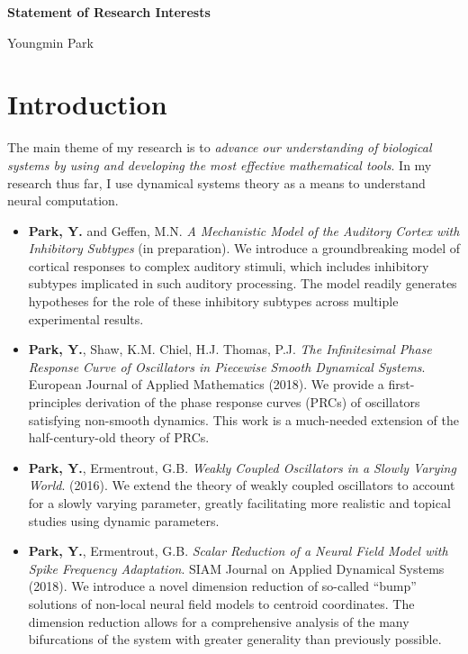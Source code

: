 \documentclass[a4paper,11pt]{article}
\begin{document}
\begin{center}
\Large \textbf{Statement of Research Interests}

\Large Youngmin Park
\end{center}


\section{Introduction}
The main theme of my research is to \textit{advance our understanding of biological systems by using and developing the most effective mathematical tools}. In my research thus far, I use dynamical systems theory as a means to understand neural computation.

\begin{itemize}
 \item \textbf{Park, Y.} and Geffen, M.N. \textit{A Mechanistic Model of the Auditory Cortex with Inhibitory Subtypes} (in preparation). We introduce a groundbreaking model of cortical responses to complex auditory stimuli, which includes inhibitory subtypes implicated in such auditory processing. The model readily generates hypotheses for the role of these inhibitory subtypes across multiple experimental results.

 \item \textbf{Park, Y.}, Shaw, K.M. Chiel, H.J. Thomas, P.J. \textit{The Infinitesimal Phase Response Curve of Oscillators in Piecewise Smooth Dynamical Systems}. European Journal of Applied Mathematics (2018). We provide a first-principles derivation of the phase response curves (PRCs) of oscillators satisfying non-smooth dynamics. This work is a much-needed extension of the half-century-old theory of PRCs.
 
 \item \textbf{Park, Y.}, Ermentrout, G.B. \textit{Weakly Coupled Oscillators in a Slowly Varying World}. (2016). We extend the theory of weakly coupled oscillators to account for a slowly varying parameter, greatly facilitating more realistic and topical studies using dynamic parameters. 
  
 \item \textbf{Park, Y.}, Ermentrout, G.B. \textit{Scalar Reduction of a Neural Field Model with Spike Frequency Adaptation}.
 SIAM Journal on Applied Dynamical Systems (2018). We introduce a novel dimension reduction of so-called ``bump'' solutions of non-local neural field models to centroid coordinates. The dimension reduction allows for a comprehensive analysis of the many bifurcations of the system with greater generality than previously possible.
 

\end{itemize}
\end{document}
